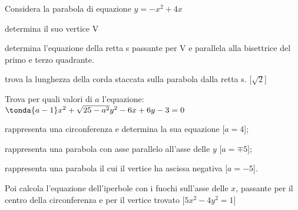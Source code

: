 \begin{esercizio}\label{ese:03.1}
Considera la parabola di equazione 
\quad \(y=-x^2+4x\) 
\begin{enumeratea}
\item determina il suo vertice V
\item determina l’equazione della retta s passante per V e parallela alla 
bisettrice del primo e terzo quadrante. 
\item trova la lunghezza della corda staccata sulla parabola dalla retta s.
\hfill [\(\sqrt{2}\)]
\end{enumeratea}
\end{esercizio}

\begin{esercizio}\label{ese:03.1}
Trova per quali valori di \(a\) l’equazione:
\quad \(\tonda{a-1}x^2+\sqrt{25-a^2}y^2-6x+6y-3=0\)
\begin{enumeratea} %
 \item rappresenta una circonferenza e determina la sua equazione
 \hfill [\(a=4\)];
 \item rappresenta una parabola con asse parallelo all’asse delle \(y\)
 \hfill [\(a=\mp 5\)];
 \item rappresenta una parabola il cui il vertice ha ascissa negativa 
 \hfill [\(a=-5\)].
\end{enumeratea}
Poi calcola l'equazione dell’iperbole con i fuochi sull’asse delle 
\(x\), passante per il centro della circonferenza e per il vertice trovato
\hfill [\(5x^2-4y^2=1\)]
\end{esercizio}

